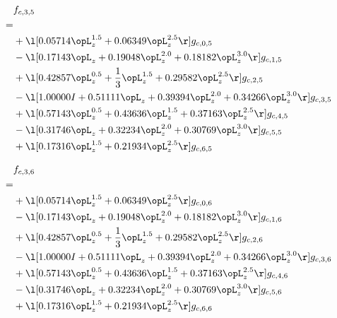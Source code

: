 \begin{alignat}{2} 
\label{eq:f_35_0} 
& f_{c,3,5} \nonumber \\ 
 = \\ 
& + \l[  0.05714 \opL_z^{1.5} +  0.06349 \opL_z^{2.5}  \r] g_{c,0,5} \nonumber \\ 
& - \l[  0.17143 \opL_z +  0.19048 \opL_z^{2.0} +  0.18182 \opL_z^{3.0}  \r] g_{c,1,5} \nonumber \\ 
& + \l[  0.42857 \opL_z^{0.5} + \frac{1}{3} \opL_z^{1.5} +  0.29582 \opL_z^{2.5}  \r] g_{c,2,5} \nonumber \\ 
& - \l[  1.00000 I +  0.51111 \opL_z +  0.39394 \opL_z^{2.0} +  0.34266 \opL_z^{3.0}  \r] g_{c,3,5} \nonumber \\ 
& + \l[  0.57143 \opL_z^{0.5} +  0.43636 \opL_z^{1.5} +  0.37163 \opL_z^{2.5}  \r] g_{c,4,5} \nonumber \\ 
& - \l[  0.31746 \opL_z +  0.32234 \opL_z^{2.0} +  0.30769 \opL_z^{3.0}  \r] g_{c,5,5} \nonumber \\ 
& + \l[  0.17316 \opL_z^{1.5} +  0.21934 \opL_z^{2.5}  \r] g_{c,6,5} \nonumber \\ 
\end{alignat} 


\begin{alignat}{2} 
\label{eq:f_36_0} 
& f_{c,3,6} \nonumber \\ 
 = \\ 
& + \l[  0.05714 \opL_z^{1.5} +  0.06349 \opL_z^{2.5}  \r] g_{c,0,6} \nonumber \\ 
& - \l[  0.17143 \opL_z +  0.19048 \opL_z^{2.0} +  0.18182 \opL_z^{3.0}  \r] g_{c,1,6} \nonumber \\ 
& + \l[  0.42857 \opL_z^{0.5} + \frac{1}{3} \opL_z^{1.5} +  0.29582 \opL_z^{2.5}  \r] g_{c,2,6} \nonumber \\ 
& - \l[  1.00000 I +  0.51111 \opL_z +  0.39394 \opL_z^{2.0} +  0.34266 \opL_z^{3.0}  \r] g_{c,3,6} \nonumber \\ 
& + \l[  0.57143 \opL_z^{0.5} +  0.43636 \opL_z^{1.5} +  0.37163 \opL_z^{2.5}  \r] g_{c,4,6} \nonumber \\ 
& - \l[  0.31746 \opL_z +  0.32234 \opL_z^{2.0} +  0.30769 \opL_z^{3.0}  \r] g_{c,5,6} \nonumber \\ 
& + \l[  0.17316 \opL_z^{1.5} +  0.21934 \opL_z^{2.5}  \r] g_{c,6,6} \nonumber \\ 
\end{alignat} 



